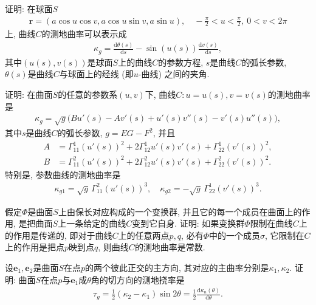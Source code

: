 \documentclass[../../main.tex]{subfiles}%
\begin{document}
\begin{example}
证明: 在球面$S$
\begin{align*}
\bm{r}=(a\cos u\cos v,a\cos u\sin v,a\sin u),\quad -\frac{\pi}{2}<u<\frac{\pi}{2},\ 0<v<2\pi
\end{align*}
上, 曲线$C$的测地曲率可以表示成
\begin{align*}
\kappa_g=\frac{\mathrm{d}\theta(s)}{\mathrm{d}s}-\sin(u(s))\frac{\mathrm{d}v(s)}{\mathrm{d}s},
\end{align*}
其中$(u(s),v(s))$是球面$S$上的曲线$C$的参数方程, $s$是曲线$C$的弧长参数, $\theta(s)$是曲线$C$与球面上的经线 (即$u$-曲线) 之间的夹角.
\end{example}

\begin{example}
证明: 在曲面$S$的任意的参数系$(u,v)$下, 曲线$C:u=u(s),v=v(s)$的测地曲率是
\begin{align*}
\kappa_g=\sqrt{g}\big(Bu'(s)-Av'(s)+u'(s)v''(s)-v'(s)u''(s)\big),
\end{align*}
其中$s$是曲线$C$的弧长参数, $g=EG-F^2$, 并且
\begin{align*}
A&=\Gamma_{11}^1(u'(s))^2+2\Gamma_{12}^1u'(s)v'(s)+\Gamma_{22}^1(v'(s))^2,\\
B&=\Gamma_{11}^2(u'(s))^2+2\Gamma_{12}^2u'(s)v'(s)+\Gamma_{22}^2(v'(s))^2.
\end{align*}
特别是, 参数曲线的测地曲率是
\begin{align*}
\kappa_{g1}=\sqrt{g}\,\Gamma_{11}^2(u'(s))^3,\quad \kappa_{g2}=-\sqrt{g}\,\Gamma_{22}^1(v'(s))^3.
\end{align*}
\end{example}

\begin{example}
假定$\Phi$是曲面$S$上由保长对应构成的一个变换群, 并且它的每一个成员在曲面上的作用, 是把曲面$S$上一条给定的曲线$C$变到它自身. 证明: 如果变换群$\Phi$限制在曲线$C$上的作用是传递的, 即对于曲线$C$上的任意两点$p,q$, 必有$\Phi$中的一个成员$\sigma$, 它限制在$C$上的作用是把点$p$映到点$q$, 则曲线$C$的测地曲率是常数.
\end{example}

\begin{example}
设$\bm{e}_1,\bm{e}_2$是曲面$S$在点$p$的两个彼此正交的主方向, 其对应的主曲率分别是$\kappa_1,\kappa_2$. 证明: 曲面$S$在点$p$与$\bm{e}_1$成$\theta$角的切方向的测地挠率是
\begin{align*}
\tau_g=\frac{1}{2}(\kappa_2-\kappa_1)\sin2\theta=\frac{1}{2}\frac{\mathrm{d}\kappa_n(\theta)}{\mathrm{d}\theta}.
\end{align*}
\end{example}
\end{document}
